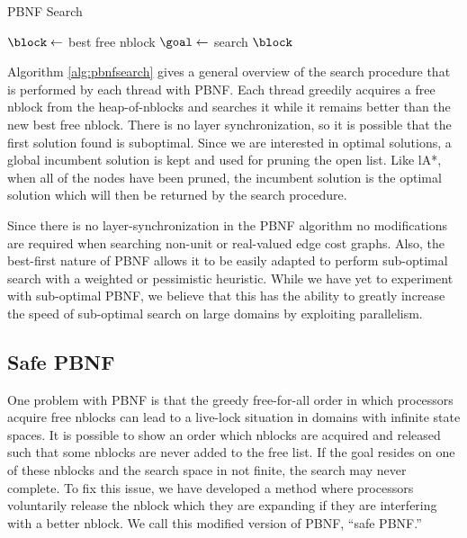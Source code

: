 \documentclass{article}
\begin{document}
\begin{algorithm}
  \caption{PBNF Search}
  \label{alg:pbnfsearch}
   {
    $\block \leftarrow$ best free nblock\;
     {
      $\goal \leftarrow$ search $\block$\;
    }
  }
\end{algorithm}

Algorithm \ref{alg:pbnfsearch} gives a general overview of the search
procedure that is performed by each thread with PBNF.  Each thread
greedily acquires a free nblock from the heap-of-nblocks and searches
it while it remains better than the new best free nblock.  There is no
layer synchronization, so it is possible that the first solution found
is suboptimal.  Since we are interested in optimal solutions, a global
incumbent solution is kept and used for pruning the open list.  Like
lA*, when all of the nodes have been pruned, the incumbent solution is
the optimal solution which will then be returned by the search
procedure.


Since there is no layer-synchronization in the PBNF algorithm no
modifications are required when searching non-unit or real-valued edge
cost graphs.  Also, the best-first nature of PBNF allows it to be
easily adapted to perform sub-optimal search with a weighted or
pessimistic heuristic.  While we have yet to experiment with
sub-optimal PBNF, we believe that this has the ability to greatly
increase the speed of sub-optimal search on large domains by
exploiting parallelism.

\subsection{Safe PBNF}

One problem with PBNF is that the greedy free-for-all order in which
processors acquire free nblocks can lead to a live-lock situation in
domains with infinite state spaces.  It is possible to show an order
which nblocks are acquired and released such that some nblocks are
never added to the free list.  If the goal resides on one of these
nblocks and the search space in not finite, the search may never
complete.  To fix this issue, we have developed a method where
processors voluntarily release the nblock which they are expanding if
they are interfering with a better nblock.  We call this modified
version of PBNF, ``safe PBNF.''
\end{document}

